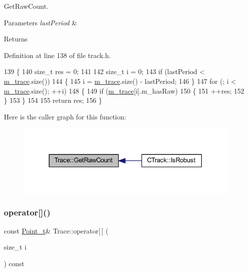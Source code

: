 Get\+Raw\+Count. 


\begin{DoxyParams}{Parameters}
{\em last\+Period} & \\
\hline
\end{DoxyParams}
\begin{DoxyReturn}{Returns}

\end{DoxyReturn}


Definition at line 138 of file track.\+h.


\begin{DoxyCode}
139     \{
140         \textcolor{keywordtype}{size\_t} res = 0;
141 
142         \textcolor{keywordtype}{size\_t} i = 0;
143         \textcolor{keywordflow}{if} (lastPeriod < \mbox{\hyperlink{class_trace_a2650850103966a19b5cbac6db8df8b66}{m\_trace}}.size())
144         \{
145             i = \mbox{\hyperlink{class_trace_a2650850103966a19b5cbac6db8df8b66}{m\_trace}}.size() - lastPeriod;
146         \}
147         \textcolor{keywordflow}{for} (; i < \mbox{\hyperlink{class_trace_a2650850103966a19b5cbac6db8df8b66}{m\_trace}}.size(); ++i)
148         \{
149             \textcolor{keywordflow}{if} (\mbox{\hyperlink{class_trace_a2650850103966a19b5cbac6db8df8b66}{m\_trace}}[i].m\_hasRaw)
150             \{
151                 ++res;
152             \}
153         \}
154 
155         \textcolor{keywordflow}{return} res;
156     \}
\end{DoxyCode}
Here is the caller graph for this function\+:\nopagebreak
\begin{figure}[H]
\begin{center}
\leavevmode
\includegraphics[width=315pt]{class_trace_abef223bff681cc1165abfeb80c4f1267_icgraph}
\end{center}
\end{figure}
\mbox{\label{class_trace_a0ed863dc4071b9081b45787ebccc7e07}} 
\subsubsection{\texorpdfstring{operator[]()}{operator[]()}\hspace{0.1cm}{\footnotesize\ttfamily [1/2]}}
{\footnotesize\ttfamily const \mbox{\hyperlink{defines_8h_a8c42696da8f098b91374a8e8bb84b430}{Point\+\_\+t}}\& Trace\+::operator\mbox{[}$\,$\mbox{]} (\begin{DoxyParamCaption}\item[{size\+\_\+t}]{i }\end{DoxyParamCaption}) const\hspace{0.3cm}{\ttfamily [inline]}}




